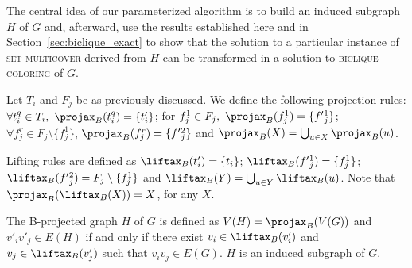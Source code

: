 The central idea of our parameterized algorithm is to build an induced subgraph $H$ of $G$ and, afterward, use the results established here and in Section~\ref{sec:biclique_exact} to show that the solution to a particular instance of \textsc{set multicover} derived from $H$ can be transformed in a solution to \textsc{biclique coloring} of $G$.


\begin{definition}
    Let $T_i$ and $F_j$ be as previously discussed.
    We define the following projection rules:
    $\forall t_i^q \in T_i,\ \Proj{B}(t_i^q) = \{t'_i\}$;
    for $f_j^1\in F_j,\ \Proj{B}(f_j^1) = \{f'{_j^1}\}$;
    $\forall f_j^r \in F_j \setminus \{f_j^1\}$, $\Proj{B}(f_j^r) = \{f'{_j^2}\}$
    and $\Proj{B}(X) = \bigcup_{u \in X} \Proj{B}(u)$.
    
    Lifting rules are defined as $\Lift{B}(t'_i) = \{t_i\}$; $\Lift{B}(f'{_j^1}) = \{f_j^1\}$; $\Lift{B}(f'{_j^2}) = F_j \setminus \{f_j^1\}$ and $\Lift{B}(Y) = \bigcup_{u \in Y} \Lift{B}(u)$. Note that $\Proj{B}(\Lift{B}(X)) = X$, for any $X$.
\end{definition}


\begin{definition}
    The B-projected graph $H$ of $G$ is defined as $V(H) = \Proj{B}(V(G))$ and $v'_iv'_j \in E(H)$ if and only if there exist $v_i \in \Lift{B}(v'_i)$ and $v_j \in \Lift{B}(v'_j)$ such that $v_iv_j \in E(G)$. $H$ is an induced subgraph of $G$.
\end{definition}

